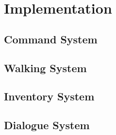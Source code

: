 \chapter{Implementation}


\section{Command System}


\section{Walking System}

\section{Inventory System}



\section{Dialogue System}
